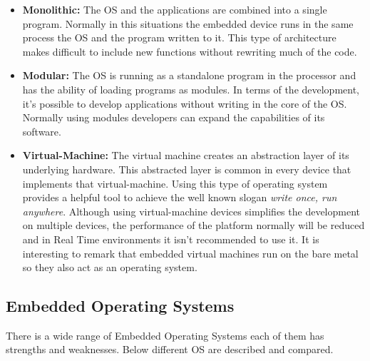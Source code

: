 \begin{itemize}
\item \textbf{Monolithic:} The OS and the applications are combined into a single program. Normally in this situations the embedded device runs in the same process the OS and the program written to it. This type of architecture makes difficult to include new functions without rewriting much of the code.

\item \textbf{Modular:} The OS is running as a standalone program in the processor and has the ability of loading programs as modules. In terms of the development, it's possible to develop applications without writing in the core of the OS. Normally using modules developers can expand the capabilities of its software.

\item \textbf{Virtual-Machine:} The virtual machine creates an abstraction layer of its underlying hardware. This abstracted layer is common in every device that implements that virtual-machine. Using this type of operating system provides a helpful tool to achieve the well known slogan \textit{write once, run anywhere}. Although using virtual-machine devices simplifies the development on multiple devices, the performance of the platform normally will be reduced and in Real Time environments it isn't recommended to use it. It is interesting to remark that embedded virtual machines run on the bare metal so they also act as an operating system.
\end{itemize}

\subsection{Embedded Operating Systems}\label{SOTA-Embedded-Operating-Systems}
There is a wide range of Embedded Operating Systems each of them has strengths and weaknesses. Below different OS are described and compared.
 
